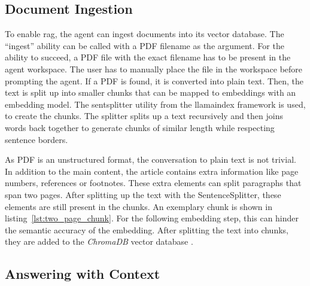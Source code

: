 \documentclass[../main.tex]{subfiles}
\begin{document}
\subsection{Document Ingestion}

To enable \gls{rag},
the agent can ingest documents into its vector database.
The “ingest” ability can be called with a PDF filename as the argument.
For the ability to succeed, a PDF file with the exact filename has to be present
in the agent workspace.
The user has to manually place the file in the workspace before prompting the agent.
If a PDF is found, it is converted into plain text.
Then, the text is split up into smaller chunks that can be mapped to embeddings
with an embedding model.
The \gls{sentsplitter} utility from the \gls{llamaindex} framework \cite{zotero-255} is used,
to create the chunks.
The splitter splits up a text recursively and then joins words back together to
generate chunks of similar length while respecting sentence borders.

As PDF is an unstructured format, the conversation to plain text is not trivial.
In addition to the main content, the article contains extra information like page numbers,
references or footnotes.
These extra elements can split paragraphs that span two pages.
After splitting up the text with the SentenceSplitter, these elements are still
present in the chunks.
An exemplary chunk is shown in listing~\ref{lst:two_page_chunk}.
For the following embedding step,
this can hinder the semantic accuracy of the embedding.
After splitting the text into chunks, they are added to the \emph{ChromaDB}
vector database \cite{zotero-176}.

\subsection{Answering with Context}

\end{document}
